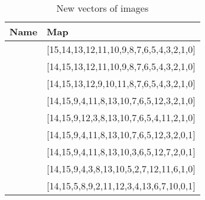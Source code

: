 \documentclass[conference]{IEEEtran}
\begin{document}
\begin{table}
\centering
\begin{tabular}{|c|l|}
\hline
Name & Map \\
\hline
&[15,14,13,12,11,10,9,8,7,6,5,4,3,2,1,0]\\
\hline
&[14,15,13,12,11,10,9,8,7,6,5,4,3,2,1,0]\\
\hline
&[14,15,13,12,9,10,11,8,7,6,5,4,3,2,1,0]\\
\hline
&[14,15,9,4,11,8,13,10,7,6,5,12,3,2,1,0]\\
\hline
&[14,15,9,12,3,8,13,10,7,6,5,4,11,2,1,0]\\
\hline
&[14,15,9,4,11,8,13,10,7,6,5,12,3,2,0,1]\\
\hline
&[14,15,9,4,11,8,13,10,3,6,5,12,7,2,0,1]\\
\hline
&[14,15,9,4,3,8,13,10,5,2,7,12,11,6,1,0]\\
\hline
&[14,15,5,8,9,2,11,12,3,4,13,6,7,10,0,1]\\
\hline
\end{tabular}
\caption{New vectors of images}
\label{New vectors of images}
\end{table}
\end{document}
